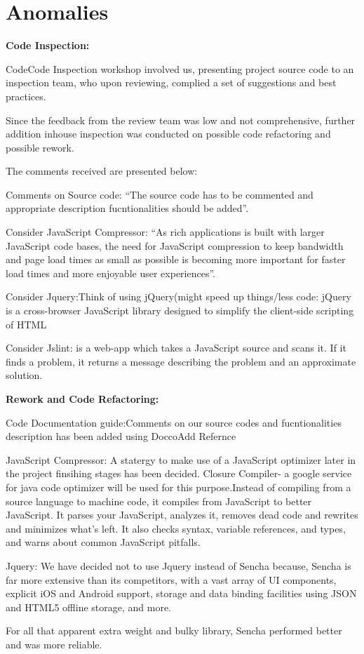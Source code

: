 \section{Anomalies} %
\label{sec:Anomalies}

\textbf{Code Inspection:}

CodeCode Inspection workshop involved us, presenting project source code to an inspection team,
who upon reviewing, complied a set of suggestions and best practices.

Since the feedback from the review team was low and not comprehensive, further addition inhouse inspection was conducted on possible 
code refactoring and possible rework.

The comments received are presented below:

Comments on Source code: ``The source code has to be commented and appropriate description fucntionalities should be added''.

Consider JavaScript Compressor: ``As rich applications is built with larger JavaScript code bases, the need for JavaScript compression 
to keep bandwidth and page load times as small as possible is becoming more important for faster load times and more enjoyable user experiences''.

Consider Jquery:Think of using jQuery(might speed up things/less code: jQuery is a cross-browser JavaScript library designed to simplify the client-side scripting of HTML
 
Consider Jslint: is a web-app which takes a JavaScript source and scans it. If it finds a problem, it returns a message describing the problem and an approximate solution. 


\textbf{Rework and Code Refactoring:}

Code Documentation guide:Comments on our source codes and fucntionalities description has been added using Docco{Add Refernce}

JavaScript Compressor: A statergy to make use of a JavaScript optimizer later in the project finsihing stages has been decided.
Closure Compiler- a google service for java code optimizer will be used for this purpose.Instead of compiling from a source language to machine code, it compiles from JavaScript to better JavaScript. It parses your JavaScript, analyzes it, removes dead code and rewrites and minimizes what's left. 
It also checks syntax, variable references, and types, and warns about common JavaScript pitfalls. 

Jquery: We have decided not to use Jquery instead of Sencha because, Sencha is far more extensive than its competitors, with a vast array of UI    
components, explicit iOS and Android support, storage and data binding facilities using JSON and HTML5 offline storage, and more.

For all that apparent extra weight and bulky library, Sencha performed better and was more reliable.

